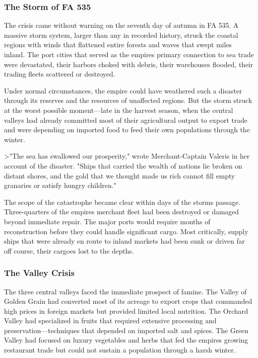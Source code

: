 \subsubsection{The Storm of FA 535}\label{the-storm-of-fa-535}

The crisis came without warning on the seventh day of autumn in FA 535.
A massive storm system, larger than any in recorded history, struck the
coastal regions with winds that flattened entire forests and waves that
swept miles inland. The port cities that served as the
empire\textquotesingle s primary connection to sea trade were
devastated, their harbors choked with debris, their warehouses flooded,
their trading fleets scattered or destroyed.

Under normal circumstances, the empire could have weathered such a
disaster through its reserves and the resources of unaffected regions.
But the storm struck at the worst possible moment---late in the harvest
season, when the central valleys had already committed most of their
agricultural output to export trade and were depending on imported food
to feed their own populations through the winter.

\textgreater"The sea has swallowed our prosperity," wrote
Merchant-Captain Valeris in her account of the disaster. "Ships that
carried the wealth of nations lie broken on distant shores, and the gold
that we thought made us rich cannot fill empty granaries or satisfy
hungry children."

The scope of the catastrophe became clear within days of the
storm\textquotesingle s passage. Three-quarters of the
empire\textquotesingle s merchant fleet had been destroyed or damaged
beyond immediate repair. The major ports would require months of
reconstruction before they could handle significant cargo. Most
critically, supply ships that were already en route to inland markets
had been sunk or driven far off course, their cargoes lost to the
depths.

\subsubsection{The Valley Crisis}\label{the-valley-crisis}

The three central valleys faced the immediate prospect of famine. The
Valley of Golden Grain had converted most of its acreage to export crops
that commanded high prices in foreign markets but provided limited local
nutrition. The Orchard Valley had specialized in fruits that required
extensive processing and preservation---techniques that depended on
imported salt and spices. The Green Valley had focused on luxury
vegetables and herbs that fed the empire\textquotesingle s growing
restaurant trade but could not sustain a population through a harsh
winter.

